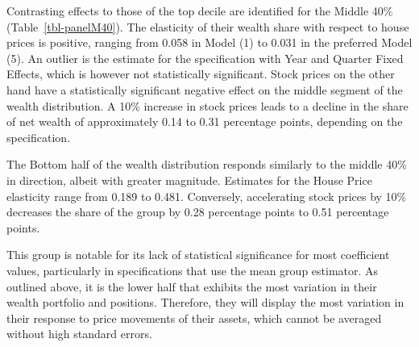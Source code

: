 \documentclass[
  a4paper,
  DIV=11,
  numbers=noendperiod]{scrartcl}
\begin{document}
Contrasting effects to those of the top decile are identified for the
Middle 40\% (Table~\ref{tbl-panelM40}). The elasticity of their wealth
share with respect to house prices is positive, ranging from 0.058 in
Model (1) to 0.031 in the preferred Model (5). An outlier is the
estimate for the specification with Year and Quarter Fixed Effects,
which is however not statistically significant. Stock prices on the
other hand have a statistically significant negative effect on the
middle segment of the wealth distribution. A 10\% increase in stock
prices leads to a decline in the share of net wealth of approximately
0.14 to 0.31 percentage points, depending on the specification.

The Bottom half of the wealth distribution responds similarly to the
middle 40\% in direction, albeit with greater magnitude. Estimates for
the House Price elasticity range from 0.189 to 0.481. Conversely,
accelerating stock prices by 10\% decreases the share of the group by
0.28 percentage points to 0.51 percentage points.

This group is notable for its lack of statistical significance for most
coefficient values, particularly in specifications that use the mean
group estimator. As outlined above, it is the lower half that exhibits
the most variation in their wealth portfolio and positions. Therefore,
they will display the most variation in their response to price
movements of their assets, which cannot be averaged without high
standard errors.
\end{document}
